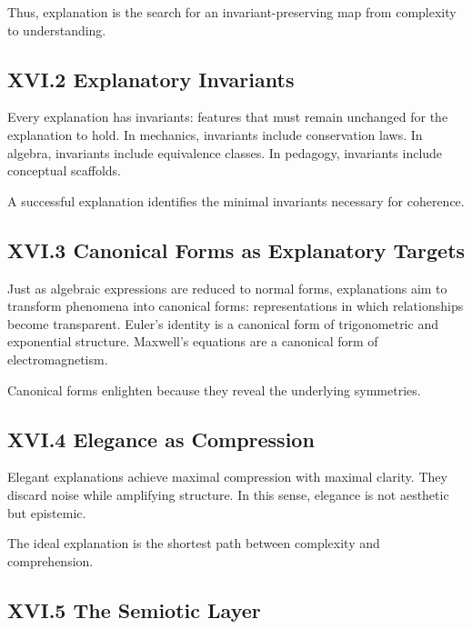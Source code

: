 \documentclass[12pt,letterpaper]{article}
\begin{document}
Thus, explanation is the search for an invariant-preserving map from complexity to understanding.

\subsection{XVI.2 Explanatory Invariants}

Every explanation has invariants: features that must remain unchanged for the explanation to hold. In mechanics, invariants include conservation laws. In algebra, invariants include equivalence classes. In pedagogy, invariants include conceptual scaffolds.

A successful explanation identifies the minimal invariants necessary for coherence.

\subsection{XVI.3 Canonical Forms as Explanatory Targets}

Just as algebraic expressions are reduced to normal forms, explanations aim to transform phenomena into canonical forms: representations in which relationships become transparent. Euler’s identity is a canonical form of trigonometric and exponential structure. Maxwell’s equations are a canonical form of electromagnetism.

Canonical forms enlighten because they reveal the underlying symmetries.

\subsection{XVI.4 Elegance as Compression}

Elegant explanations achieve maximal compression with maximal clarity. They discard noise while amplifying structure. In this sense, elegance is not aesthetic but epistemic.

The ideal explanation is the shortest path between complexity and comprehension.

\subsection{XVI.5 The Semiotic Layer}
\end{document}
